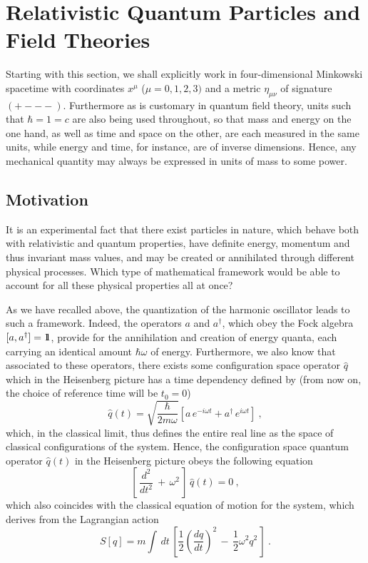 \documentclass[a4paper,11pt]{article}
\def\one{1\hskip -.37em 1}
\begin{document}
\section{Relativistic Quantum Particles and Field Theories}
\label{Sect3}

Starting with this section, we shall explicitly work in four-dimensional
Minkowski spacetime with coordinates $x^\mu$ ($\mu=0,1,2,3)$ and
a metric $\eta_{\mu\nu}$ of signature $(+---)$. Furthermore as is
customary in quantum field theory, units such that $\hbar=1=c$ are also 
being used throughout, so that mass and energy on the one hand, as well
as time and space on the other, are each measured in the same units,
while energy and time, for instance, are of inverse dimensions. Hence,
any mechanical quantity may always be expressed in units of mass
to some power.

\subsection{Motivation}
\label{Subsect3.1}

It is an experimental fact that there exist particles in nature, which
behave both with relativistic and quantum properties, have definite
energy, momentum and thus invariant mass values, and may be created
or annihilated through different physical processes. Which type of
mathematical framework would be able to account for all these physical
properties all at once? 

As we have recalled above, the quantization of the harmonic oscillator
leads to such a framework. Indeed, the operators $a$ and $a^\dagger$,
which obey the Fock algebra $[a,a^\dagger]=\one$,
provide for the annihilation and creation of energy quanta, each
carrying an identical amount $\hbar\omega$ of energy. Furthermore,
we also know that associated to these operators, there exists some
configuration space operator $\hat{q}$ which in the Heisenberg picture
has a time dependency defined by (from now on, the choice of
reference time will be $t_0=0$)
\begin{equation}
\hat{q}(t)=\sqrt{\frac{\hbar}{2m\omega}}\left[a\,e^{-i\omega t}+
a^\dagger\,e^{i\omega t}\right]\ ,
\label{eq:HOsuperposition}
\end{equation}
which, in the classical limit, thus defines the entire real line
as the space of classical configurations of
the system. Hence, the configuration space quantum operator $\hat{q}(t)$
in the Heisenberg picture obeys the following equation
\begin{equation}
\left[\,\frac{d^2}{dt^2}\ +\,\omega^2\,\right]\,\hat{q}(t)=0\ ,
\end{equation}
which also coincides with the classical equation of motion for the
system, which derives from the Lagrangian action
\begin{equation}
S[q]=m\int\,dt\,\left[\frac{1}{2}\left(\frac{dq}{dt}\right)^2\,-\,
\frac{1}{2}\omega^2q^2\,\right]\ .
\end{equation}
\end{document}
